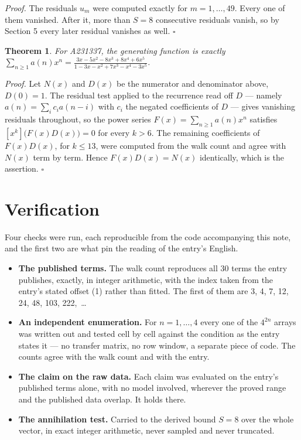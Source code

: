 \documentclass[11pt]{article}
\newtheorem{theorem}{Theorem}
\theoremstyle{definition}
\begin{document}
{\itshape Proof.} The residuals $u_m$ were computed exactly for $m = 1,\dots,49$. Every one of them vanished. After it, more than $S = 8$ consecutive residuals vanish, so by Section 5 every later residual vanishes as well. $\square$

\begin{theorem} For A231337, the generating function is exactly $\sum_{n\ge 1} a(n)x^n = \frac{3x - 5x^{2} - 8x^{3} + 8x^{4} + 6x^{5}}{1 - 3x - x^{2} + 7x^{3} - x^{4} - 3x^{5}}$.\end{theorem}

{\itshape Proof.} Let $N(x)$ and $D(x)$ be the numerator and denominator above, $D(0)=1$. The residual test applied to the recurrence read off $D$ --- namely $a(n) = \sum_i c_i a(n-i)$ with $c_i$ the negated coefficients of $D$ --- gives vanishing residuals throughout, so the power series $F(x)=\sum_{n\ge 1}a(n)x^n$ satisfies $[x^k]\bigl(F(x)D(x)\bigr) = 0$ for every $k > 6$. The remaining coefficients of $F(x)D(x)$, for $k \le 13$, were computed from the walk count and agree with $N(x)$ term by term. Hence $F(x)D(x) = N(x)$ identically, which is the assertion. $\square$

\section{Verification}

Four checks were run, each reproducible from the code accompanying this note, and the first two are what pin the reading of the entry's English.

\begin{itemize}

\item {\bfseries The published terms.} The walk count reproduces all 30 terms the entry publishes, exactly, in integer arithmetic, with the index taken from the entry's stated offset (1) rather than fitted. The first of them are 3, 4, 7, 12, 24, 48, 103, 222,~\dots

\item {\bfseries An independent enumeration.} For $n = 1,\dots,4$ every one of the $4^{2n}$ arrays was written out and tested cell by cell against the condition as the entry states it --- no transfer matrix, no row window, a separate piece of code. The counts agree with the walk count and with the entry.

\item {\bfseries The claim on the raw data.} Each claim was evaluated on the entry's published terms alone, with no model involved, wherever the proved range and the published data overlap. It holds there.

\item {\bfseries The annihilation test.} Carried to the derived bound $S = 8$ over the whole vector, in exact integer arithmetic, never sampled and never truncated.

\end{itemize}
\end{document}
